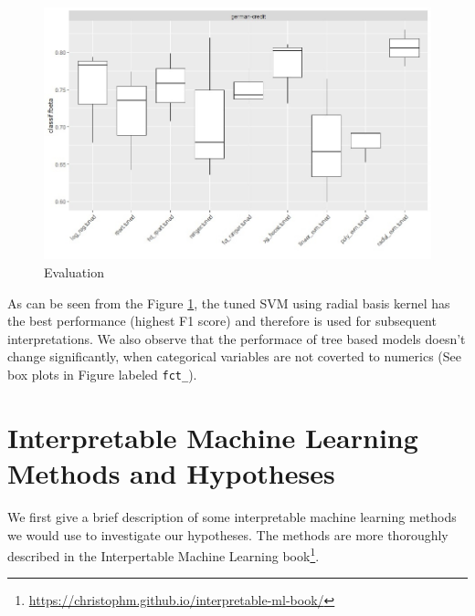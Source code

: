 \documentclass[
]{article}
\newenvironment{Shaded}{\begin{snugshade}}{\end{snugshade}}
\newcommand{\KeywordTok}[1]{\textcolor[rgb]{0.13,0.29,0.53}{\textbf{#1}}}
\newcommand{\NormalTok}[1]{#1}
\newcommand{\OperatorTok}[1]{\textcolor[rgb]{0.81,0.36,0.00}{\textbf{#1}}}
\newcommand{\StringTok}[1]{\textcolor[rgb]{0.31,0.60,0.02}{#1}}
\begin{document}
\begin{figure}

{\centering \includegraphics[width=0.8\linewidth]{plots/fbeta} 

}

\caption{Evaluation}\label{fig:evaluation-results}
\end{figure}

As can be seen from the Figure \ref{fig:evaluation-results}, the tuned SVM using radial basis kernel has the best performance (highest F1 score) and therefore is used for subsequent interpretations. We also observe that the performace of tree based models doesn't change significantly, when categorical variables are not coverted to numerics (See box plots in Figure labeled \texttt{fct\_}).

\begin{Shaded}
\end{Shaded}

\hypertarget{interpretable-machine-learning-methods-and-hypotheses}{%
\section{Interpretable Machine Learning Methods and Hypotheses}\label{interpretable-machine-learning-methods-and-hypotheses}}

We first give a brief description of some interpretable machine learning methods we would use to investigate our hypotheses. The methods are more thoroughly described in the Interpertable Machine Learning book\footnote{\url{https://christophm.github.io/interpretable-ml-book/}}.
\end{document}
